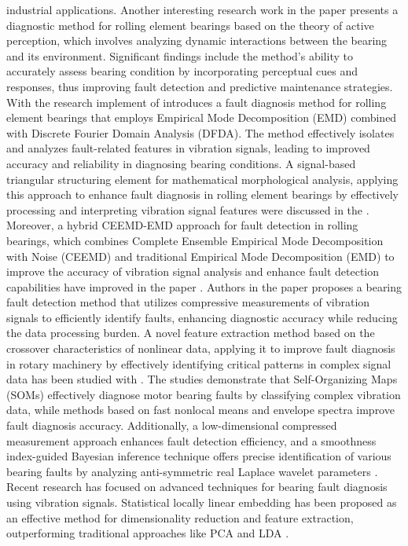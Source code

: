 \documentclass[sn-basic,pdflatex]{sn-jnl}
\theoremstyle{remark}
\theoremstyle{definition}
\begin{document}
industrial applications. Another interesting research work in the paper
\citep{WOS:000360994300029} presents a diagnostic method for rolling
element bearings based on the theory of active perception, which
involves analyzing dynamic interactions between the bearing and its
environment. Significant findings include the method's ability to
accurately assess bearing condition by incorporating perceptual cues and
responses, thus improving fault detection and predictive maintenance
strategies. With the research implement of \citep{WOS:000343577703075}
introduces a fault diagnosis method for rolling element bearings that
employs Empirical Mode Decomposition (EMD) combined with Discrete
Fourier Domain Analysis (DFDA). The method effectively isolates and
analyzes fault-related features in vibration signals, leading to
improved accuracy and reliability in diagnosing bearing conditions. A
signal-based triangular structuring element for mathematical
morphological analysis, applying this approach to enhance fault
diagnosis in rolling element bearings by effectively processing and
interpreting vibration signal features were discussed in the
\citep{WOS:000334316700001}. Moreover, a hybrid CEEMD-EMD approach for
fault detection in rolling bearings, which combines Complete Ensemble
Empirical Mode Decomposition with Noise (CEEMD) and traditional
Empirical Mode Decomposition (EMD) to improve the accuracy of vibration
signal analysis and enhance fault detection capabilities have improved
in the paper \citep{WOS:000412752200052}. Authors in the paper
\citep{WOS:000335959500009} proposes a bearing fault detection method
that utilizes compressive measurements of vibration signals to
efficiently identify faults, enhancing diagnostic accuracy while
reducing the data processing burden. A novel feature extraction method
based on the crossover characteristics of nonlinear data, applying it to
improve fault diagnosis in rotary machinery by effectively identifying
critical patterns in complex signal data has been studied with
\citep{WOS:000338603900013}. The studies demonstrate that
Self-Organizing Maps (SOMs) effectively diagnose motor bearing faults by
classifying complex vibration data, while methods based on fast nonlocal
means and envelope spectra improve fault diagnosis accuracy.
Additionally, a low-dimensional compressed measurement approach enhances
fault detection efficiency, and a smoothness index-guided Bayesian
inference technique offers precise identification of various bearing
faults by analyzing anti-symmetric real Laplace wavelet parameters
\citep[\citet{WOS:000348309400067}, \citet{WOS:000354607100016},
\citet{WOS:000350998800016}]{WOS:000380543400119}. Recent research has
focused on advanced techniques for bearing fault diagnosis using
vibration signals. Statistical locally linear embedding has been
proposed as an effective method for dimensionality reduction and feature
extraction, outperforming traditional approaches like PCA and LDA
\citep{WOS:000361788200068}.
\end{document}
